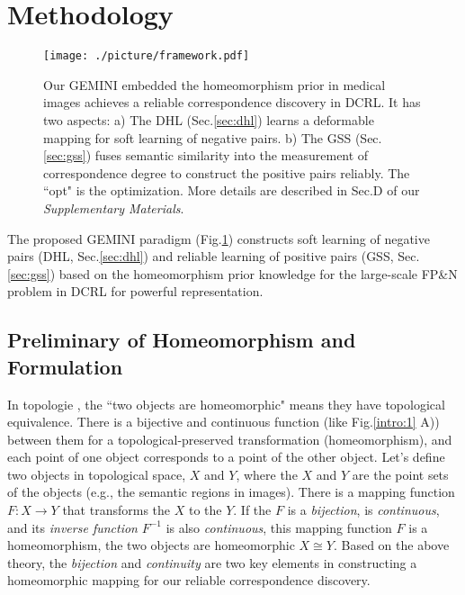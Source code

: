 \section{Methodology}
\label{sec:methodology}
\begin{figure}
  \centering
  \texttt{[image: ./picture/framework.pdf]}
  \caption{Our GEMINI embedded the homeomorphism prior in medical images achieves a reliable correspondence discovery in DCRL. It has two aspects: a) The DHL (Sec.\ref{sec:dhl}) learns a deformable mapping for soft learning of negative pairs. b) The GSS (Sec.\ref{sec:gss}) fuses semantic similarity into the measurement of correspondence degree to construct the positive pairs reliably. The ``opt" is the optimization. More details are described in Sec.D of our \emph{Supplementary Materials}.}\label{method:framework}
\end{figure}
The proposed GEMINI paradigm (Fig.\ref{method:framework}) constructs soft learning of negative pairs (DHL, Sec.\ref{sec:dhl}) and reliable learning of positive pairs (GSS, Sec.\ref{sec:gss}) based on the homeomorphism prior knowledge for the large-scale FP\&N problem in DCRL for powerful representation.

\subsection{Preliminary of Homeomorphism and Formulation}\label{sec:hp}
In topologie \cite{alexandroff2013topologie}, the ``two objects are homeomorphic" means they have topological equivalence. There is a bijective and continuous function (like Fig.\ref{intro:1} A)) between them for a topological-preserved transformation (homeomorphism), and each point of one object corresponds to a point of the other object. Let's define two objects in topological space, $X$ and $Y$, where the $X$ and $Y$ are the point sets of the objects (e.g., the semantic regions in images). There is a mapping function $F:X\rightarrow Y$ that transforms the $X$ to the $Y$. If the $F$ is a \emph{bijection}, is \emph{continuous}, and its \emph{inverse function} $F^{-1}$ is also \emph{continuous}, this mapping function $F$ is a homeomorphism, the two objects are homeomorphic $X\cong Y$. Based on the above theory, the \emph{bijection} and \emph{continuity} are two key elements in constructing a homeomorphic mapping for our reliable correspondence discovery.

